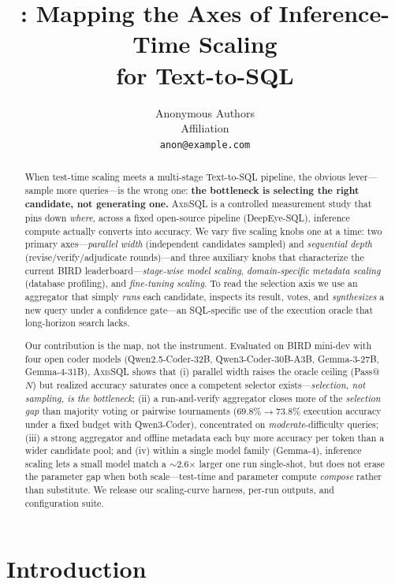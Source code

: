 \documentclass{article}
\title{\sys: Mapping the Axes of Inference-Time Scaling\\ for Text-to-SQL}
\author{
Anonymous Authors\\
Affiliation\\
\texttt{anon@example.com}
}
\newcommand{\sys}{\textsc{AxisSQL}\xspace}
\begin{document}
\maketitle

\begin{abstract}
When test-time scaling meets a multi-stage Text-to-SQL pipeline, the obvious lever---sample more queries---is the wrong one: \textbf{the bottleneck is selecting the right candidate, not generating one.} \sys{} is a controlled measurement study that pins down \emph{where}, across a fixed open-source pipeline (DeepEye-SQL), inference compute actually converts into accuracy. We vary five scaling knobs one at a time: two primary axes---\emph{parallel width} (independent candidates sampled) and \emph{sequential depth} (revise/verify/adjudicate rounds)---and three auxiliary knobs that characterize the current BIRD leaderboard---\emph{stage-wise model scaling}, \emph{domain-specific metadata scaling} (database profiling), and \emph{fine-tuning scaling}. To read the selection axis we use an aggregator that simply \emph{runs} each candidate, inspects its result, votes, and \emph{synthesizes} a new query under a confidence gate---an SQL-specific use of the execution oracle that long-horizon search lacks.

Our contribution is the map, not the instrument. Evaluated on BIRD mini-dev with four open coder models (Qwen2.5-Coder-32B, Qwen3-Coder-30B-A3B, Gemma-3-27B, Gemma-4-31B), \sys{} shows that (i) parallel width raises the oracle ceiling (Pass@$N$) but realized accuracy saturates once a competent selector exists---\emph{selection, not sampling, is the bottleneck}; (ii) a run-and-verify aggregator closes more of the \emph{selection gap} than majority voting or pairwise tournaments ($69.8\%\!\rightarrow\!73.8\%$ execution accuracy under a fixed budget with Qwen3-Coder), concentrated on \emph{moderate}-difficulty queries; (iii) a strong aggregator and offline metadata each buy more accuracy per token than a wider candidate pool; and (iv) within a single model family (Gemma-4), inference scaling lets a small model match a $\sim$2.6$\times$ larger one run single-shot, but does not erase the parameter gap when both scale---test-time and parameter compute \emph{compose} rather than substitute. We release our scaling-curve harness, per-run outputs, and configuration suite.
\end{abstract}

\section{Introduction}
\label{sec:intro}
\end{document}
